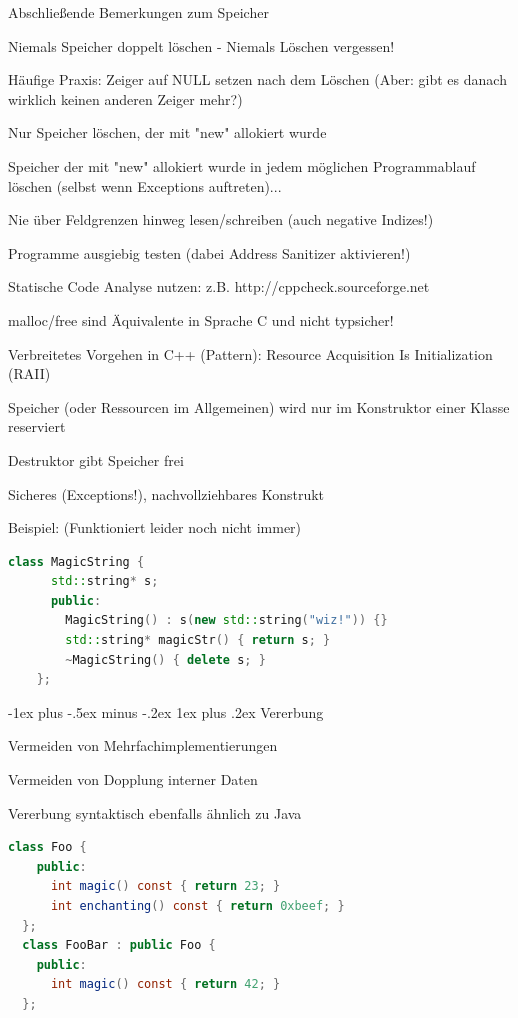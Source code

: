 \documentclass[10pt]{article}
\makeatletter
\renewcommand{\subsubsection}{\@startsection{subsubsection}{3}{0mm}%
                                {-1ex plus -.5ex minus -.2ex}%
                                {1ex plus .2ex}%
                                {\normalfont\small\bfseries}}
\makeatother
\begin{document}
\begin{itemize*}
  \item Abschließende Bemerkungen zum Speicher
  \begin{itemize*}
    \item Niemals Speicher doppelt löschen - Niemals Löschen vergessen!
    \item Häufige Praxis: Zeiger auf NULL setzen nach dem Löschen (Aber: gibt es danach wirklich keinen anderen Zeiger mehr?)
    \item Nur Speicher löschen, der mit "new" allokiert wurde
    \item Speicher der mit "new" allokiert wurde in jedem möglichen Programmablauf löschen (selbst wenn Exceptions auftreten)...
    \item Nie über Feldgrenzen hinweg lesen/schreiben (auch negative Indizes!)
    \item Programme ausgiebig testen (dabei Address Sanitizer aktivieren!)
    \item Statische Code Analyse nutzen: z.B. http://cppcheck.sourceforge.net
    \item malloc/free sind Äquivalente in Sprache C und nicht typsicher!
  \end{itemize*}
  \item Verbreitetes Vorgehen in C++ (Pattern): Resource Acquisition Is Initialization (RAII)
  \begin{itemize*}
    \item Speicher (oder Ressourcen im Allgemeinen) wird nur im Konstruktor einer Klasse reserviert
    \item Destruktor gibt Speicher frei
    \item Sicheres (Exceptions!), nachvollziehbares Konstrukt
    \item Beispiel: (Funktioniert leider noch nicht immer)
    \begin{lstlisting}[language=C++]
    class MagicString {
      std::string* s;
      public:
        MagicString() : s(new std::string("wiz!")) {}
        std::string* magicStr() { return s; }
        ~MagicString() { delete s; }
    };
    \end{lstlisting}
  \end{itemize*}
\end{itemize*}

\subsubsection{Vererbung}
\begin{itemize*}
  \item Vermeiden von Mehrfachimplementierungen
  \item Vermeiden von Dopplung interner Daten
  \item Vererbung syntaktisch ebenfalls ähnlich zu Java
  \begin{lstlisting}[language=java]
  class Foo {
    public:
      int magic() const { return 23; }
      int enchanting() const { return 0xbeef; }
  };
  class FooBar : public Foo {
    public:
      int magic() const { return 42; }
  };
  \end{lstlisting}
\end{itemize*}
\end{document}
